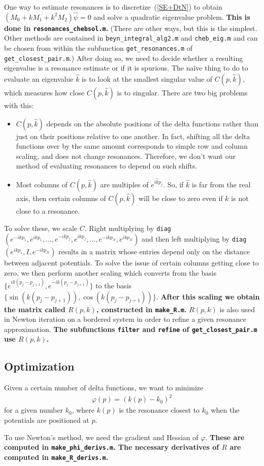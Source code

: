 \documentclass[letterpaper,12pt]{article}
\begin{document}
One way to estimate resonances is to discretize~(\ref{SE+DtN}) to
obtain $\left(M_0 + kM_1 + k^2M_2\right)\hat{\psi} = 0$ and solve
a quadratic eigenvalue problem. {\bf This is done in 
\texttt{resonances\_chebsol.m}.} (There are other ways, but this is
the simplest. Other methods are contained in \texttt{beyn\_integral\_alg2.m}
and \texttt{cheb\_eig.m} and can be chosen from within the subfunction
\texttt{get\_resonances.m} of \texttt{get\_closest\_pair.m}.) 
After doing so, we need to decide
whether a resulting eigenvalue is a resonance estimate or if it is
spurious. The na\"ive thing to do to evaluate an eigenvalue $\hat{k}$
is to look at the smallest singular value of $C(p,\hat{k})$, which
measures how close $C(p,\hat{k})$ is to singular. There are two big
problems with this:
\begin{itemize}
 \item $C(p,\hat{k})$ depends on the absolute positions of the delta
       functions rather than just on their positions relative
       to one another. In fact, shifting all the delta functions
       over by the same amount corresponds to simple row and
       column scaling, and does not change resonances. Therefore,
       we don't want our method of evaluating resonances to 
       depend on such shifts.
 \item Most columns of $C(p,\hat{k})$ are multiples of $e^{i\hat{k}p_j}$. 
       So, if $\hat{k}$ is far from the real axis, then certain columns
       of $C(p,\hat{k})$ will be close to zero even if $\hat{k}$ is not
       close to a resonance.
\end{itemize}

To solve these, we scale $C$. Right multiplying by \texttt{diag}$(e^{-ikp_1},
e^{ikp_1},...,e^{-ikp_j},e^{ikp_j},...,e^{-ikp_N},e^{ikp_N})$ and then
left multiplying by \texttt{diag}$(e^{ikp_1},I,e^{-ikp_N})$ results in a
matrix whose entries depend only on the distance between adjacent potentials.
To solve the issue of certain columns getting close to zero, we then perform
another scaling which converts from the basis $\lbrace e^{ik(p_j-p_{j+1})},
e^{-ik(p_j-p_{j+1})} \rbrace$ to the basis $\lbrace \sin(k(p_j-p_{j+1})),
\cos(k(p_j-p_{j+1})) \rbrace$. {\bf After this scaling we obtain the
matrix called $R(p,k)$, constructed in \texttt{make\_R.m}.}
$R(p,k)$ is also used in Newton iteration on a bordered system in order
to refine a given resonance approximation. {\bf The subfunctions 
\texttt{filter} and \texttt{refine} of \texttt{get\_closest\_pair.m}
use $R(p,k)$.}

\subsection*{Optimization}

Given a certain number of delta functions, we want to minimize
\begin{align*}
 \varphi(p) = (k(p)-k_0)^2
\end{align*}
for a given number $k_0$, where $k(p)$ is the resonance closest to
$k_0$ when the potentials are positioned at $p$.

To use Newton's method, we need the gradient and Hessian of $\varphi$.
{\bf These are computed in \texttt{make\_phi\_derivs.m}. The necessary
derivatives of $R$ are computed in \texttt{make\_R\_derivs.m}.}
\end{document}
